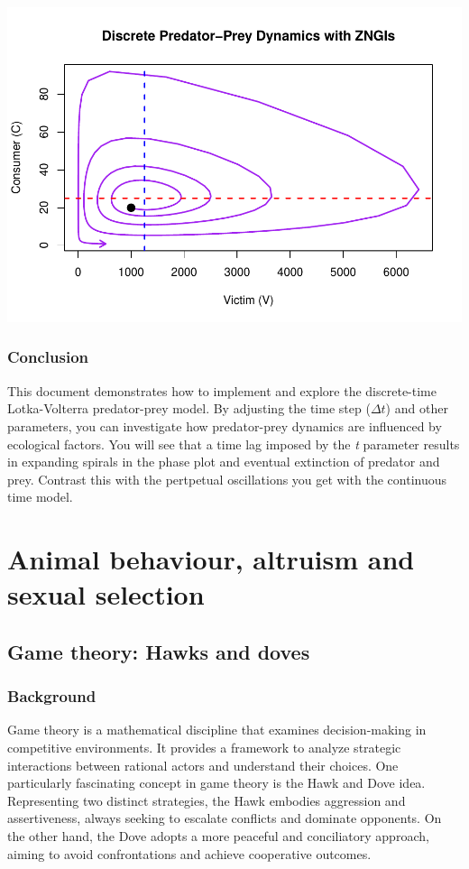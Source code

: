 \documentclass[
  a4paper]{book}
\begin{document}
\includegraphics{BB512_files/figure-latex/DT-phase-plot-1.pdf}

\section{Conclusion}\label{conclusion-1}

This document demonstrates how to implement and explore the discrete-time Lotka-Volterra predator-prey model. By adjusting the time step (\(\Delta t\)) and other parameters, you can investigate how predator-prey dynamics are influenced by ecological factors. You will see that a time lag imposed by the \emph{t} parameter results in expanding spirals in the phase plot and eventual extinction of predator and prey. Contrast this with the pertpetual oscillations you get with the continuous time model.

\part{Animal behaviour, altruism and sexual selection}\label{part-animal-behaviour-altruism-and-sexual-selection}

\chapter{Game theory: Hawks and doves}\label{game-theory-hawks-and-doves}

\section{Background}\label{background-17}

Game theory is a mathematical discipline that examines decision-making in competitive environments. It provides a framework to analyze strategic interactions between rational actors and understand their choices. One particularly fascinating concept in game theory is the Hawk and Dove idea. Representing two distinct strategies, the Hawk embodies aggression and assertiveness, always seeking to escalate conflicts and dominate opponents. On the other hand, the Dove adopts a more peaceful and conciliatory approach, aiming to avoid confrontations and achieve cooperative outcomes.
\end{document}
